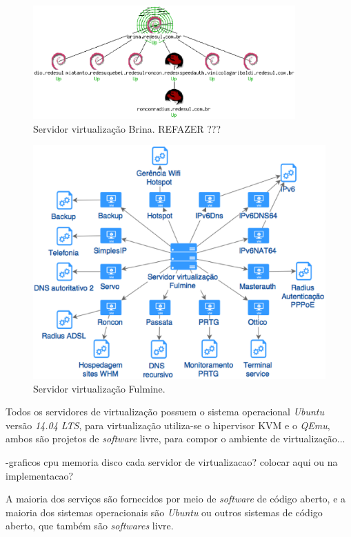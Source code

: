 \begin{figure}[servlog1]
 \centering
 \includegraphics[width=380px]{img/servlog1.eps}
 \caption{Servidor virtualização Brina. REFAZER ???}
 \label{fig:servlog1}
\end{figure}

\begin{figure}[servlog2]
 \centering
 \includegraphics[width=430px]{img/servlog2.eps}
 \caption{Servidor virtualização Fulmine.}
 \label{fig:servlog2}
\end{figure}

Todos os servidores de virtualização possuem o sistema operacional \textit{Ubuntu} versão \textit{14.04 LTS}, para virtualização utiliza-se o 
hipervisor \ac{KVM} e o \textit{QEmu}, ambos são projetos de \textit{software} livre, para compor o ambiente de virtualização...

-graficos cpu memoria disco cada servidor de virtualizacao? colocar aqui ou na implementacao?

A maioria dos serviços são fornecidos por meio de \textit{software} de código aberto, e a maioria dos sistemas operacionais são \textit{Ubuntu}
ou outros sistemas de código aberto, que também são \textit{softwares} livre.

